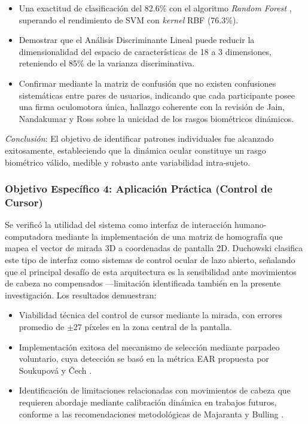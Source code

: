 \begin{itemize}
	\item Una exactitud de clasificación del 82.6\% con el algoritmo \textit{Random Forest} \cite{breiman2001}, superando el rendimiento de SVM con \textit{kernel} RBF (76.3\%).
	\item Demostrar que el Análisis Discriminante Lineal \cite{fisher1936use} puede reducir la dimensionalidad del espacio de características de 18 a 3 dimensiones, reteniendo el 85\% de la varianza discriminativa.
	\item Confirmar mediante la matriz de confusión que no existen confusiones sistemáticas entre pares de usuarios, indicando que cada participante posee una firma oculomotora única, hallazgo coherente con la revisión de Jain, Nandakumar y Ross \cite{jain2016biometric} sobre la unicidad de los rasgos biométricos dinámicos.
\end{itemize}

\textit{Conclusión}: El objetivo de identificar patrones individuales fue alcanzado exitosamente, estableciendo que la dinámica ocular constituye un rasgo biométrico válido, medible y robusto ante variabilidad intra-sujeto.
\subsubsection{Objetivo Específico 4: Aplicación Práctica (Control de Cursor)}

Se verificó la utilidad del sistema como interfaz de interacción humano-computadora mediante la implementación de una matriz de homografía que mapea el vector de mirada 3D a coordenadas de pantalla 2D.
Duchowski \cite{duchowski2017} clasifica este tipo de interfaz como sistemas de control ocular de lazo abierto, señalando que el principal desafío de esta arquitectura es la sensibilidad ante movimientos de cabeza no compensados —limitación identificada también en la presente investigación.
Los resultados demuestran:

\begin{itemize}
	\item Viabilidad técnica del control de cursor mediante la mirada, con errores promedio de $\pm$27 píxeles en la zona central de la pantalla.
	\item Implementación exitosa del mecanismo de selección mediante parpadeo voluntario, cuya detección se basó en la métrica EAR propuesta por Soukupová y Čech \cite{soukupova2016real}.
	\item Identificación de limitaciones relacionadas con movimientos de cabeza que requieren abordaje mediante calibración dinámica en trabajos futuros, conforme a las recomendaciones metodológicas de Majaranta y Bulling \cite{majaranta2014eye}.
\end{itemize}

